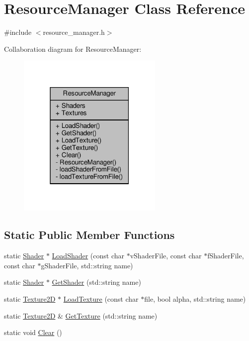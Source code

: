 \hypertarget{classResourceManager}{}\section{Resource\+Manager Class Reference}
\label{classResourceManager}


{\ttfamily \#include $<$resource\+\_\+manager.\+h$>$}



Collaboration diagram for Resource\+Manager\+:
\nopagebreak
\begin{figure}[H]
\begin{center}
\leavevmode
\includegraphics[width=198pt]{classResourceManager__coll__graph}
\end{center}
\end{figure}
\subsection*{Static Public Member Functions}
\begin{DoxyCompactItemize}
\item 
static \hyperlink{classShader}{Shader} $\ast$ \hyperlink{classResourceManager_a241bb97b7dfaf9939fd644ac9fbdd5b4}{Load\+Shader} (const char $\ast$v\+Shader\+File, const char $\ast$f\+Shader\+File, const char $\ast$g\+Shader\+File, std\+::string name)
\item 
static \hyperlink{classShader}{Shader} $\ast$ \hyperlink{classResourceManager_ae95ecdc6de1127616485f7d069437332}{Get\+Shader} (std\+::string name)
\item 
static \hyperlink{classTexture2D}{Texture2D} $\ast$ \hyperlink{classResourceManager_afe6ce47645a38b6e77b838c0edbe0368}{Load\+Texture} (const char $\ast$file, bool alpha, std\+::string name)
\item 
static \hyperlink{classTexture2D}{Texture2D} \& \hyperlink{classResourceManager_a28909ad11a419e76ef00bf6a2b00ac4f}{Get\+Texture} (std\+::string name)
\item 
static void \hyperlink{classResourceManager_aecd08b92634fad3316442c267a04e8c4}{Clear} ()
\end{DoxyCompactItemize}

